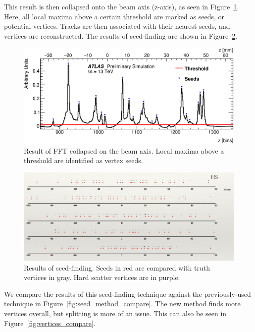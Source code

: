 This result is then collapsed onto the beam axis (z-axis), as seen in Figure~\ref{fig:seeds}. Here, all local maxima above a certain threshold are marked as seeds, or potential vertices. Tracks are then associated with their nearest seeds, and vertices are reconstructed. The results of seed-finding are shown in Figure~\ref{fig:seed_comparison}.

\begin{figure}[h]
    \centering
    \includegraphics[width=0.9\linewidth]{Images/Other/seeds.png}
    \caption{Result of FFT collapsed on the beam axis. Local maxima above a threshold are identified as vertex seeds.}
    \label{fig:seeds}
\end{figure}

\begin{figure}[h]
    \centering
    \includegraphics[width=\linewidth]{Images/Other/seed_comparison.png}
    \caption{Results of seed-finding. Seeds in red are compared with truth vertices in gray. Hard scatter vertices are in purple.}
    \label{fig:seed_comparison}
\end{figure}

We compare the results of this seed-finding technique against the previously-used technique in Figure~\ref{fig:seed_method_compare}. The new method finds more vertices overall, but splitting is more of an issue. This can also be seen in Figure~\ref{fig:vertices_compare}.

